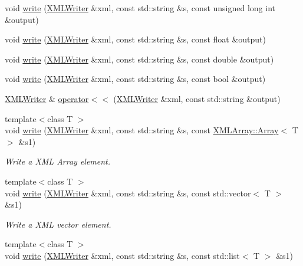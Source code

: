 \begin{DoxyCompactItemize}
void \mbox{\hyperlink{group__io_gaca56f1bd58c3916a9c9ca8f0041b9c21}{write}} (\mbox{\hyperlink{classADATXML_1_1XMLWriter}{X\+M\+L\+Writer}} \&xml, const std\+::string \&s, const unsigned long int \&output)
\item 
void \mbox{\hyperlink{group__io_ga004a6551422be9e3a46d53e5e974acfd}{write}} (\mbox{\hyperlink{classADATXML_1_1XMLWriter}{X\+M\+L\+Writer}} \&xml, const std\+::string \&s, const float \&output)
\item 
void \mbox{\hyperlink{group__io_gae1439bc15e3d4497d18ecc77d6443d3b}{write}} (\mbox{\hyperlink{classADATXML_1_1XMLWriter}{X\+M\+L\+Writer}} \&xml, const std\+::string \&s, const double \&output)
\item 
void \mbox{\hyperlink{group__io_gaa6f01baa873f2c676d573b16ff3a1099}{write}} (\mbox{\hyperlink{classADATXML_1_1XMLWriter}{X\+M\+L\+Writer}} \&xml, const std\+::string \&s, const bool \&output)
\item 
\mbox{\hyperlink{classADATXML_1_1XMLWriter}{X\+M\+L\+Writer}} \& \mbox{\hyperlink{group__io_gaf8d83226be4c0dca61d0f9d2cad6f57b}{operator$<$$<$}} (\mbox{\hyperlink{classADATXML_1_1XMLWriter}{X\+M\+L\+Writer}} \&xml, const std\+::string \&output)
\item 
{\footnotesize template$<$class T $>$ }\\void \mbox{\hyperlink{group__io_ga505002df14eea0ecd6a4c92bfdc6425d}{write}} (\mbox{\hyperlink{classADATXML_1_1XMLWriter}{X\+M\+L\+Writer}} \&xml, const std\+::string \&s, const \mbox{\hyperlink{classXMLArray_1_1Array}{X\+M\+L\+Array\+::\+Array}}$<$ T $>$ \&s1)
\begin{DoxyCompactList}\small\item\em Write a X\+ML Array element. \end{DoxyCompactList}\item 
{\footnotesize template$<$class T $>$ }\\void \mbox{\hyperlink{group__io_gad6746caf2a4ff29e3ae8da748fd880a7}{write}} (\mbox{\hyperlink{classADATXML_1_1XMLWriter}{X\+M\+L\+Writer}} \&xml, const std\+::string \&s, const std\+::vector$<$ T $>$ \&s1)
\begin{DoxyCompactList}\small\item\em Write a X\+ML vector element. \end{DoxyCompactList}\item 
{\footnotesize template$<$class T $>$ }\\void \mbox{\hyperlink{group__io_ga442a3dd5472737a074d3774f46a94f14}{write}} (\mbox{\hyperlink{classADATXML_1_1XMLWriter}{X\+M\+L\+Writer}} \&xml, const std\+::string \&s, const std\+::list$<$ T $>$ \&s1)

\end{DoxyCompactItemize}
